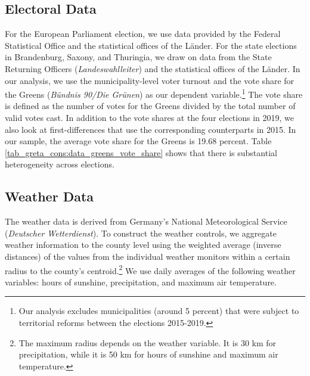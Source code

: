 









\subsection{Electoral Data}
For the European Parliament election, we use data provided by the Federal Statistical Office and the statistical offices of the Länder. For the state elections in Brandenburg, Saxony, and Thuringia, we draw on data from the State Returning Officers (\textit{Landeswahlleiter}) and the statistical offices of the Länder. In our analysis, we use the municipality-level voter turnout and the vote share for the Greens (\textit{Bündnis 90/Die Grünen}) as our dependent variable.\footnote{Our analysis excludes municipalities (around 5 percent) that were subject to territorial reforms between the elections 2015-2019.} The vote share is defined as the number of votes for the Greens divided by the total number of valid votes cast. In addition to the vote shares at the four elections in 2019, we also look at first-differences that use the corresponding counterparts in 2015. In our sample, the average vote share for the Greens is 19.68 percent. Table \ref{tab_greta_cons:data_greens_vote_share} shows that there is substantial heterogeneity across elections.













\subsection{Weather Data}
The weather data is derived from Germany's National Meteorological Service (\textit{Deutscher Wetterdienst}). To construct the weather controls, we aggregate weather information to the county level using the weighted average (inverse distances) of the values from the individual weather monitors within a certain radius to the county's centroid.\footnote{The maximum radius depends on the weather variable. It is 30 km for precipitation, while it is 50 km for hours of sunshine and maximum air temperature.} We use daily averages of the following weather variables: hours of sunshine, precipitation, and maximum air temperature. 



